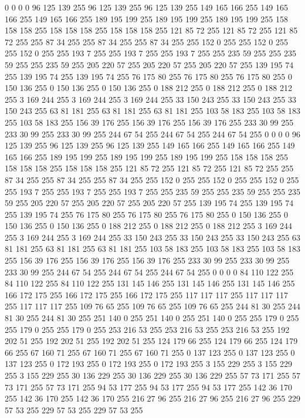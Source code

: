 0 0 0 0 96 125 139 255 96 125 139 255 96 125 139 255 149 165 166 255 149 165 166 255 149 165 166 255 189 195 199 255 189 195 199 255 189 195 199 255 158 158 158 255 158 158 158 255 158 158 158 255 121 85 72 255 121 85 72 255 121 85 72 255
255 87 34 255 255 87 34 255 255 87 34 255 255 152 0 255 255 152 0 255 255 152 0 255 255 193 7 255 255 193 7 255 255 193 7 255 255 235 59 255 255 235 59 255 255 235 59 255 205 220 57 255 205 220 57 255 205 220 57 255 139 195 74 255
139 195 74 255 139 195 74 255 76 175 80 255 76 175 80 255 76 175 80 255 0 150 136 255 0 150 136 255 0 150 136 255 0 188 212 255 0 188 212 255 0 188 212 255 3 169 244 255 3 169 244 255 3 169 244 255 33 150 243 255 33 150 243 255
33 150 243 255 63 81 181 255 63 81 181 255 63 81 181 255 103 58 183 255 103 58 183 255 103 58 183 255 156 39 176 255 156 39 176 255 156 39 176 255 233 30 99 255 233 30 99 255 233 30 99 255 244 67 54 255 244 67 54 255 244 67 54 255
0 0 0 0 96 125 139 255 96 125 139 255 96 125 139 255 149 165 166 255 149 165 166 255 149 165 166 255 189 195 199 255 189 195 199 255 189 195 199 255 158 158 158 255 158 158 158 255 158 158 158 255 121 85 72 255 121 85 72 255 121 85 72 255
255 87 34 255 255 87 34 255 255 87 34 255 255 152 0 255 255 152 0 255 255 152 0 255 255 193 7 255 255 193 7 255 255 193 7 255 255 235 59 255 255 235 59 255 255 235 59 255 205 220 57 255 205 220 57 255 205 220 57 255 139 195 74 255
139 195 74 255 139 195 74 255 76 175 80 255 76 175 80 255 76 175 80 255 0 150 136 255 0 150 136 255 0 150 136 255 0 188 212 255 0 188 212 255 0 188 212 255 3 169 244 255 3 169 244 255 3 169 244 255 33 150 243 255 33 150 243 255
33 150 243 255 63 81 181 255 63 81 181 255 63 81 181 255 103 58 183 255 103 58 183 255 103 58 183 255 156 39 176 255 156 39 176 255 156 39 176 255 233 30 99 255 233 30 99 255 233 30 99 255 244 67 54 255 244 67 54 255 244 67 54 255
0 0 0 0 84 110 122 255 84 110 122 255 84 110 122 255 131 145 146 255 131 145 146 255 131 145 146 255 166 172 175 255 166 172 175 255 166 172 175 255 117 117 117 255 117 117 117 255 117 117 117 255 109 76 65 255 109 76 65 255 109 76 65 255
244 81 30 255 244 81 30 255 244 81 30 255 251 140 0 255 251 140 0 255 251 140 0 255 255 179 0 255 255 179 0 255 255 179 0 255 253 216 53 255 253 216 53 255 253 216 53 255 192 202 51 255 192 202 51 255 192 202 51 255 124 179 66 255
124 179 66 255 124 179 66 255 67 160 71 255 67 160 71 255 67 160 71 255 0 137 123 255 0 137 123 255 0 137 123 255 0 172 193 255 0 172 193 255 0 172 193 255 3 155 229 255 3 155 229 255 3 155 229 255 30 136 229 255 30 136 229 255
30 136 229 255 57 73 171 255 57 73 171 255 57 73 171 255 94 53 177 255 94 53 177 255 94 53 177 255 142 36 170 255 142 36 170 255 142 36 170 255 216 27 96 255 216 27 96 255 216 27 96 255 229 57 53 255 229 57 53 255 229 57 53 255
